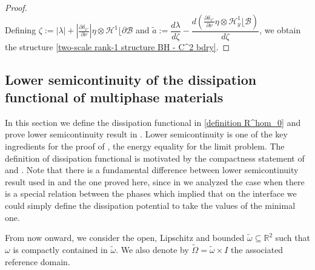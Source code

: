\documentclass[reqno,10pt]{amsart}
\numberwithin{equation}{section}
\theoremstyle{remark}
\newcommand{\calB}{\mathcal{B}}
\newcommand{\calH}{\mathcal{H}}
\newcommand{\calL}{\mathcal{L}}
\newcommand{\R}{\mathbb{R}}
\newcommand{\calT}{\mathcal{T}}
\newcommand{\mres}[1]{\lfloor{#1}}
\newcommand{\genprod}{\stackrel{\text{gen.}}{\otimes}}
\newcommand{\ext}[1]{\widetilde{#1}}
\begin{document}
\begin{proof}
\begin{equation*}
\end{equation*}
Defining 
$\zeta := |\lambda| + \left|\frac{\partial \delta_{x'}}{\partial\nu}\right| \eta\otimes \calH^1\mres\partial \calB$ and 
$\tilde{a} := \dfrac{d\lambda}{d\zeta} - \dfrac{d \left(\frac{\partial \delta_{x'}}{\partial\nu} \eta\otimes \calH^1_y \mres \calB\right)}{d\zeta}$, 
we obtain the structure \eqref{two-scale rank-1 structure BH - C^2 bdry}.
\end{proof}

\subsection{Lower semicontinuity of the dissipation functional of multiphase materials} \label{semicontinuity of the dissipation functional}

In this section we define the dissipation functional in \eqref{definition R^hom_0} and prove lower semicontinuity result in . 
Lower semicontinuity is one of the key ingredients for the proof of , the energy equality for the limit problem. The definition of dissipation functional is motivated by the compactness statement of  and . 
Note that there is a fundamental difference between lower semicontinuity result used in \cite{Buzancic.Davoli.Velcic.2024.2nd} and the one proved here, since in \cite{Buzancic.Davoli.Velcic.2024.2nd} we analyzed the case when there is a special relation between the phases which implied that on the interface we could simply define the dissipation potential to take the values of the minimal one.

From now onward, we consider the open, Lipschitz and bounded $\ext{\omega} \subseteq \R^2$ such that $\omega$ is compactly contained in $\ext{\omega}$. 
We also denote by $\ext{\Omega} = \ext{\omega} \times I$ the associated reference domain.
\end{document}
